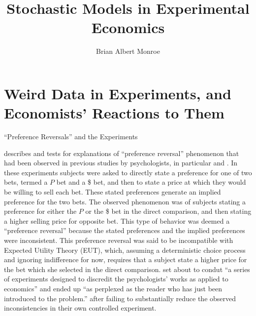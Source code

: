 \documentclass[11pt,a4paper]{report}
\title{Stochastic Models in Experimental Economics}
\author{Brian Albert Monroe}
\makeatletter
\newcommand{\lltoc}[1]{
	\pagenumbering{gobble}
	\makeatletter
	\@starttoc{toc}%
	\makeatother
	\break
	\pagenumbering{arabic}
}
\let\oldchapter\chapter
\renewcommand{\chapter}[1]{
	\refstepcounter{chapter}%
	\oldchapter*{{\huge Chapter \thechapter}\\[1em]#1}
}
\newcommand{\onlyinsubfile}[1]{#1}
\newcommand{\notinsubfile}[1]{}
\makeatother
\begin{document}
\renewcommand{\onlyinsubfile}[1]{}
\renewcommand{\notinsubfile}[1]{#1}
\renewcommand{\lltoc}[1]{}
\let\chapter\oldchapter

\maketitle
\onehalfspacing
\tableofcontents


\onehalfspacing
\setcounter{chapter}{0}
\chapter{Weird Data in Experiments, and Economists' Reactions to Them}

\lltoc

\section{\enquote{Preference Reversals} and the \texorpdfstring{\textcite{Grether1979}}{Grether \& Plott (1979)}  Experiments}

\textcite{Grether1979} describes and tests for explanations of \enquote{preference reversal} phenomenon that had been observed in previous studies by psychologists, in particular \textcite{Lichtenstein1971, Lichtenstein1973} and \textcite{Lindman1971}.
In these experiments subjects were asked to directly state a preference for one of two bets, termed a $P$ bet and a \$ bet,  and then to state a price at which they would be willing to sell each bet.
These stated preferences generate an implied preference for the two bets.
The observed phenomenon was of subjects stating a preference for either the $P$ or the \$ bet in the direct comparison, and then stating a higher selling price for opposite bet.
This type of behavior was deemed a \enquote{preference reversal} because the stated preferences and the implied preferences were inconsistent.
This preference reversal was said to be incompatible with Expected Utility Theory (EUT), which, assuming a deterministic choice process and ignoring indifference for now, requires that a subject state a higher price for the bet which she selected in the direct comparison.
\textcite[623]{Grether1979} set about to condut \enquote{a series of experiments designed to discredit the psychologists' works as applied to economics} and ended up \enquote{as perplexed as the reader who has just been introduced to the problem.} \parencite*[624]{Grether1979} after failing to substantially reduce the observed inconsistencies in their own controlled experiment.
\end{document}
